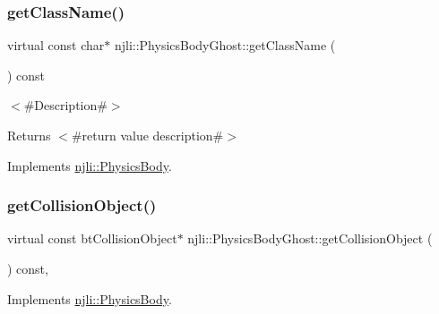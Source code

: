 \mbox{\label{classnjli_1_1_physics_body_ghost_aa04661e7cd05271931351076c53991b2}} 
\subsubsection{\texorpdfstring{get\+Class\+Name()}{getClassName()}}
{\footnotesize\ttfamily virtual const char$\ast$ njli\+::\+Physics\+Body\+Ghost\+::get\+Class\+Name (\begin{DoxyParamCaption}{ }\end{DoxyParamCaption}) const\hspace{0.3cm}{\ttfamily [virtual]}}

$<$\#\+Description\#$>$

\begin{DoxyReturn}{Returns}
$<$\#return value description\#$>$ 
\end{DoxyReturn}


Implements \mbox{\hyperlink{classnjli_1_1_physics_body_a9ba235d39a1b994f22a13edeff862ba3}{njli\+::\+Physics\+Body}}.

\mbox{\label{classnjli_1_1_physics_body_ghost_a79b35eaf9c790ef43ad3e0f4a8a4c518}} 
\subsubsection{\texorpdfstring{get\+Collision\+Object()}{getCollisionObject()}\hspace{0.1cm}{\footnotesize\ttfamily [1/2]}}
{\footnotesize\ttfamily virtual const bt\+Collision\+Object$\ast$ njli\+::\+Physics\+Body\+Ghost\+::get\+Collision\+Object (\begin{DoxyParamCaption}{ }\end{DoxyParamCaption}) const\hspace{0.3cm}{\ttfamily [protected]}, {\ttfamily [virtual]}}



Implements \mbox{\hyperlink{classnjli_1_1_physics_body_a48031c76bbe2bd9c4540d6d27b8b42bb}{njli\+::\+Physics\+Body}}.

